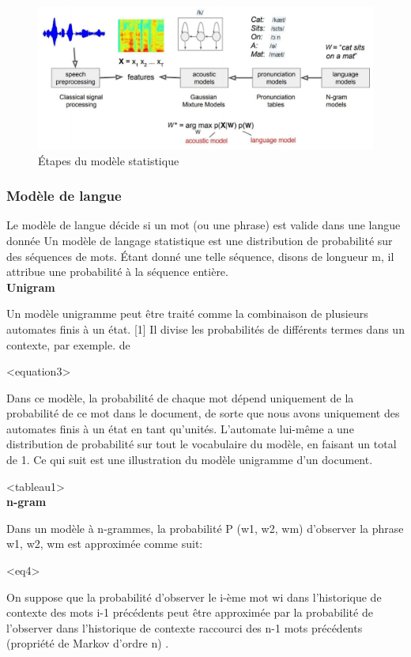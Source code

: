 \documentclass[a4paper, 12pt]{book}
\begin{document}
\begin{figure}[htbp]
  \centering
  \includegraphics[width=1\linewidth]{fig/model.png}
  \caption{Étapes du modèle statistique}
\end{figure}

\subsubsection{Modèle de langue}

Le modèle de langue décide si un mot (ou une phrase) est valide dans une langue donnée Un modèle de langage statistique est une distribution de probabilité sur des séquences de mots. Étant donné une telle séquence, disons de longueur m, il attribue une probabilité à la séquence entière.\\

\textbf{Unigram}

Un modèle unigramme peut être traité comme la combinaison de plusieurs automates finis à un état. [1] Il divise les probabilités de différents termes dans un contexte, par exemple. de

<equation3>

Dans ce modèle, la probabilité de chaque mot dépend uniquement de la probabilité de ce mot dans le document, de sorte que nous avons uniquement des automates finis à un état en tant qu'unités. L'automate lui-même a une distribution de probabilité sur tout le vocabulaire du modèle, en faisant un total de 1. Ce qui suit est une illustration du modèle unigramme d'un document.

<tableau1>\\

\textbf{n-gram}

Dans un modèle à n-grammes, la probabilité P (w1, w2, wm) d’observer la phrase w1, w2, wm est approximée comme suit:

<eq4>

On suppose que la probabilité d'observer le i-ème mot wi dans l'historique de contexte des mots i-1 précédents peut être approximée par la probabilité de l'observer dans l'historique de contexte raccourci des n-1 mots précédents (propriété de Markov d'ordre n) .
\end{document}
